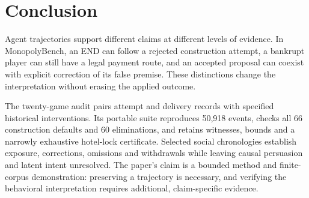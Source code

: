 \section{Conclusion}

Agent trajectories support different claims at different levels of evidence. In MonopolyBench, an END can follow a rejected construction attempt, a bankrupt player can still have a legal payment route, and an accepted proposal can coexist with explicit correction of its false premise. These distinctions change the interpretation without erasing the applied outcome.

The twenty-game audit pairs attempt and delivery records with specified historical interventions. Its portable suite reproduces 50,918 events, checks all 66 construction defaults and 60 eliminations, and retains witnesses, bounds and a narrowly exhaustive hotel-lock certificate. Selected social chronologies establish exposure, corrections, omissions and withdrawals while leaving causal persuasion and latent intent unresolved. The paper's claim is a bounded method and finite-corpus demonstration: preserving a trajectory is necessary, and verifying the behavioral interpretation requires additional, claim-specific evidence.

